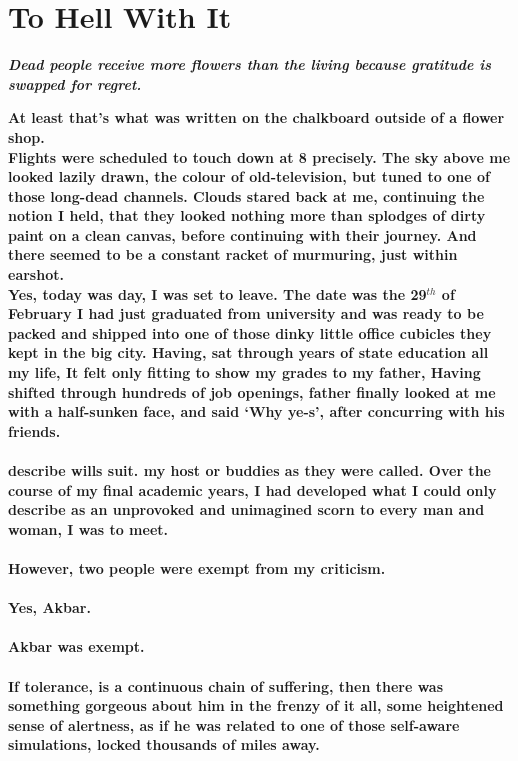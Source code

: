 \documentclass{book}
\begin{document}
\chapter*{\textbf{To Hell With It}}
\newpage
	\begin{center}
		\textbf{\huge{\textit{Dead people receive more flowers than the living because
		gratitude is swapped for regret.}}}
	\end{center}
	\smallskip
	\Large{\textbf{At least that's what was written on the chalkboard
	outside of a flower shop.\\
	Flights were scheduled to touch down
	at 8 precisely. The sky above me looked lazily drawn,
	the colour of old-television, but tuned to one of those
	long-dead channels. Clouds stared back at me,
	continuing the notion I held, that they looked nothing more
	than splodges of dirty paint on a clean canvas, before continuing
	with their journey.
	And there seemed to be a constant
	racket of murmuring, just within earshot.\\
	Yes, today was day, I was set to leave.
	The date was the 29$^{th}$ of February
	I had just graduated from university
	and was ready to be packed and shipped into one
	of those dinky little office cubicles they kept in the big city.
    Having, sat through years of state education all my life, It felt only fitting
    to show my grades to my father,
	Having shifted through hundreds of job openings, father finally
	looked at me with a half-sunken face, and said `Why ye-s', after concurring with his friends.\\\\
	describe wills suit. my host or buddies as they were called.
	Over the course of my final academic years, I had developed
	what I could only describe as an unprovoked and unimagined
	scorn to every man and woman, I was to meet.\\\\
	However, two people were exempt from my criticism.\\\\
 	Yes, Akbar.\\\\Akbar was exempt.\\\\
	If tolerance, is a continuous chain of suffering,
	then there was something gorgeous about him in the frenzy of it all,
    some heightened sense of alertness, as if he was
	related to one of those self-aware simulations, locked thousands of miles away.\\
}}
\end{document}
